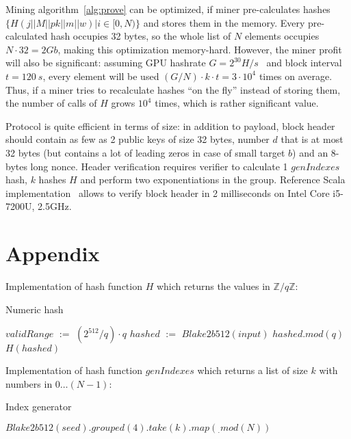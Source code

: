 \documentclass[]{article}
\def\Let#1#2{\State #1 $:=$ #2}
\begin{document}
    Mining algorithm~\ref{alg:prove} can be optimized, if miner pre-calculates
    hashes\newline $\{H(j||M||pk||m||w)|i \in [0,N)\}$ and stores them in the memory.
    Every pre-calculated hash occupies 32 bytes, so the whole list of $N$ elements
    occupies $N \cdot 32 = 2 Gb$, making this optimization memory-hard.
    However, the miner profit will also be significant: assuming GPU hashrate
    $G = 2^{30} H/s$~\cite{gpuHashrate} and block interval $t=120~s$, every element
    will be used $(G / N) \cdot k \cdot t = 3 \cdot 10^4$ times on average.
    Thus, if a miner tries to 
    recalculate hashes ``on the fly'' instead of storing them, the number of
    calls of $H$ grows $10^4$ times, which is rather significant value.

    Protocol is quite efficient in terms of size: in addition to payload, block header should
    contain as few as 2 public keys of size 32 bytes, number $d$ that is at most 32 bytes
    (but contains a lot of leading zeros in case of small target $b$) and an
    8-bytes long nonce. Header verification requires verifier to calculate 1 $genIndexes$
    hash, $k$ hashes $H$ and perform two exponentiations in the group. Reference
    Scala implementation~\cite{ergoGit} allows to verify block header in 2
    milliseconds on Intel Core i5-7200U, 2.5GHz.

    

    \section*{Appendix}
    \label{appendix}

    Implementation of hash function $H$ which returns the values in $\mathbb{Z}/q\mathbb{Z}$:

    \begin{algorithm}[H]
        \caption{Numeric hash}
        \label{alg:H}
        \begin{algorithmic}[1]
            \Let{$validRange$}{$(2^{512} / q) \cdot q$}
            \Let{$hashed$}{$Blake2b512(input)$}
            \State \Return $hashed.mod(q)$
            \Else
            \State \Return $H(hashed)$
            \EndIf
            \EndFunction
        \end{algorithmic}
    \end{algorithm}

    Implementation of hash function $genIndexes$ which returns a list of size $k$ with numbers in $0\dots (N-1)$:

    \begin{algorithm}[H]
        \caption{Index generator}
        \label{alg:genIndexes}
        \begin{algorithmic}[1]
            \State \Return $Blake2b512(seed).grouped(4).take(k).map(_.mod(N))$
            \EndFunction
        \end{algorithmic}
    \end{algorithm}
\end{document}
